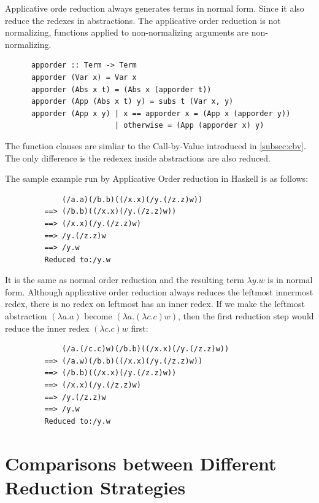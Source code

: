 \documentclass[a4paper,11pt,twoside]{report}
\begin{document}
Applicative orde reduction always generates terms in normal form. Since it also reduce the redexes in abstractions. The applicative order reduction is not normalizing, functions applied to non-normalizing arguments are non-normalizing.



\begin{verbatim}
      apporder :: Term -> Term
      apporder (Var x) = Var x
      apporder (Abs x t) = (Abs x (apporder t))
      apporder (App (Abs x t) y) = subs t (Var x, y)
      apporder (App x y) | x == apporder x = (App x (apporder y))
                         | otherwise = (App (apporder x) y)  
\end{verbatim}

The function clauses are simliar to the Call-by-Value introduced in \ref{subsec:cbv}. The only difference is the redexex inside abstractions are also reduced.


The sample example run by Applicative Order reduction in Haskell is as follows:

\begin{verbatim}
             (/a.a)(/b.b)((/x.x)(/y.(/z.z)w))
         ==> (/b.b)((/x.x)(/y.(/z.z)w))
         ==> (/x.x)(/y.(/z.z)w)
         ==> /y.(/z.z)w
         ==> /y.w
         Reduced to:/y.w
\end{verbatim}

It is the same as normal order reduction and the resulting term $\lambda y.w$ is in normal form. Although applicative order reduction always reduces the leftmost innermost redex, there is no redex on leftmost has an inner redex. If we make the leftmost abstraction $(\lambda a.a)$ become $(\lambda a.(\lambda c.c)w)$, then the first reduction step would reduce the inner redex $(\lambda c.c)w$ first:

\begin{verbatim}
             (/a.(/c.c)w)(/b.b)((/x.x)(/y.(/z.z)w))
         ==> (/a.w)(/b.b)((/x.x)(/y.(/z.z)w))
         ==> (/b.b)((/x.x)(/y.(/z.z)w))
         ==> (/x.x)(/y.(/z.z)w)
         ==> /y.(/z.z)w
         ==> /y.w
         Reduced to:/y.w
\end{verbatim}


\section{Comparisons between Different Reduction Strategies }
\end{document}
